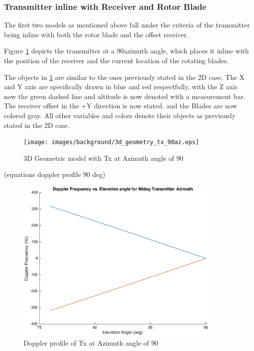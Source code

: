 \subsubsection{Transmitter inline with Receiver and Rotor Blade}
The first two models as mentioned above fall under the criteria of the transmitter being inline with both the rotor blade and the offset receiver. 

Figure \ref{fig:3D_model_90az} depicts the transmitter at a 90\textdegree \space azimuth angle, which places it inline with the position of the receiver and the current location of the rotating blades. 

The objects in \ref{fig:3D_model_90az}  are similar to the ones previously stated in the 2D case. The X and Y axis are specifically drawn in blue and red respectfully, with the Z axis now the green dashed line and altitude is now denoted with a measurement bar. The receiver offset in the +Y direction is now stated. and the Blades are now colored gray. All other variables and colors denote their objects as previously stated in the 2D case. 

\begin{figure}
	\begin{center}
		\texttt{[image: images/background/3d\_geometry\_tx\_90az.eps]}
		\caption{3D Geometric model with Tx at Azimuth angle of 90\textdegree}
		\label{fig:3D_model_90az}
	\end{center}
\end{figure}

(equations doppler profile 90 deg)

\begin{figure}
	\begin{center}
		\includegraphics[width=10cm]{images/background/3d_geometry_tx_90az_doppler_profile.eps}
		\caption{Doppler profile of Tx at Azimuth angle of 90\textdegree}
		\label{fig:3D_model_90az_doppler}
	\end{center}
\end{figure}


